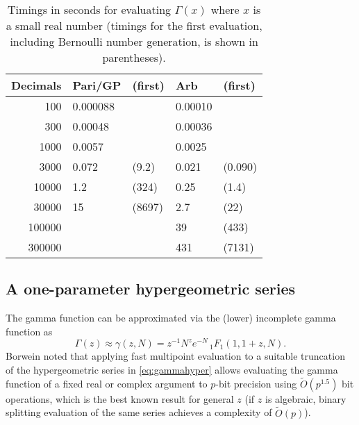\documentclass{sig-alternate}
\newcommand   \OOsoft {\tilde O}
\begin{document}
\begin{table}[ht!] \label{tab:gammatime}
\centering
\begin{tabular}{r | l l l l}
Decimals & Pari/GP & (first) & Arb & (first) \\ \hline
100 & 0.000088 & & 0.00010 & \\
300 & 0.00048 & & 0.00036 & \\
1000 & 0.0057 & & 0.0025 & \\
3000 & 0.072 & (9.2) & 0.021 & (0.090) \\
10000 & 1.2 & (324) & 0.25 & (1.4) \\
30000 & 15 & (8697) & 2.7 & (22) \\
100000 &   & &  39 & (433) \\
300000 &   & &  431 & (7131) \\
\end{tabular}
\caption{Timings in seconds for evaluating $\Gamma(x)$
where $x$ is a small real number (timings for the first evaluation,
including Bernoulli number generation, is shown in parentheses).}
\end{table}

\subsection{A one-parameter hypergeometric series}

The gamma function can be approximated via the (lower)
incomplete gamma function as
\begin{equation}
\Gamma(z) \approx \gamma(z,N) = z^{-1} N^z e^{-N} \,_1F_1(1,1+z,N).
\label{eq:gammahyper}
\end{equation}
Borwein \cite{Borwein1987} noted that applying fast multipoint evaluation
to a suitable truncation of the hypergeometric series in \eqref{eq:gammahyper}
allows evaluating the gamma function
of a fixed real or complex argument to $p$-bit precision
using $\OOsoft(p^{1.5})$ bit operations,
which is the best known result for general $z$ (if $z$ is algebraic,
binary splitting evaluation of the same series
achieves a complexity of $\OOsoft(p)$).
\end{document}
